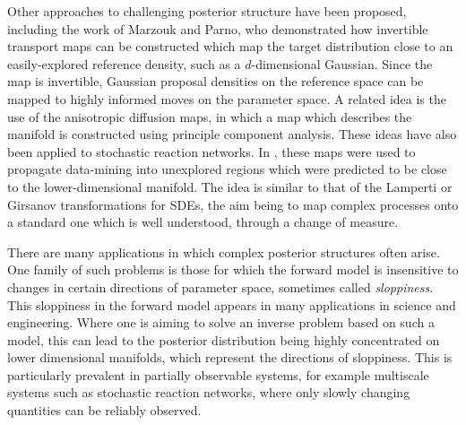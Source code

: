 \documentclass[final]{siamltex}
\newcommand{\edit}[1]{{\color{red} #1}}
\begin{document}
Other approaches to challenging posterior structure have been
proposed, including the work of Marzouk and Parno\cite{parno2018transport}, who
demonstrated how invertible transport maps can be constructed which
map the target distribution close to an easily-explored reference
density, such as a $d$-dimensional Gaussian. Since the map is
invertible, Gaussian proposal densities on the reference space can be
mapped to highly informed moves on the parameter space. A related idea
is the use of the anisotropic diffusion maps\cite{singer2008non}, in
which a map which describes the manifold is constructed using
principle component analysis. These ideas have also been applied to
stochastic reaction
networks\cite{singer2009detecting,dsilva2016data}. In
\cite{chiavazzo2017intrinsic}, these maps were used to propagate
data-mining into unexplored regions which were predicted to be close
to the lower-dimensional manifold. The idea is similar to that of the
Lamperti or Girsanov transformations for SDEs\cite{flandrin2003stationarity,gardiner2009stochastic},  the aim being to map complex
processes onto a standard one which is well understood, through a
change of measure.

\edit{
There are many applications in which complex posterior structures
often arise. One family of such problems is those for which the
forward model is insensitive to changes in certain directions of
parameter space, sometimes called
\emph{sloppiness}\cite{gutenkunst2007universally,apgar2010sloppy}. This
sloppiness in the forward model appears in many applications in
science and engineering\cite{constantine2014active}. Where one is
aiming to solve an inverse problem based on such a model, this can
lead to the posterior distribution being highly concentrated on lower
dimensional manifolds, which represent the directions of
sloppiness. This is particularly prevalent in partially observable
systems, for example multiscale systems such
as stochastic reaction networks, where only slowly changing quantities
can be reliably observed.}



\end{document}
